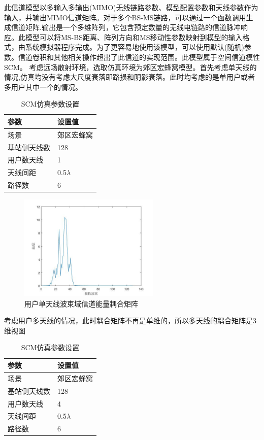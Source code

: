 \documentclass[bachelor,nocolorlinks, printoneside]{seuthesis} %
\begin{document}
\begin{Main}
此信道模型以多输入多输出(MIMO)无线链路参数、模型配置参数和天线参数作为输入，并输出MIMO信道矩阵。对于多个BS-MS链路，可以通过一个函数调用生成信道矩阵.输出是一个多维阵列，它包含预定数量的无线电链路的信道脉冲响应。此模型可以将MS-BS距离、阵列方向和MS移动性参数映射到模型的输入格式，由系统模拟器程序完成。为了更容易地使用该模型，可以使用默认(随机)参数。信道卷积和其他相关操作超出了此信道的实现范围。此模型属于空间信道模性SCM。
考虑远场散射环境，选取仿真环境为郊区宏蜂窝模型。首先考虑单天线的情况,仿真均没有考虑大尺度衰落即路损和阴影衰落。此时均考虑的是单用户或者多用户其中一个的情况。
\begin{table}[htbp]
	\centering
	\caption{\label{tab:test}SCM仿真参数设置}
	\begin{tabular}{ll}
		\toprule
		参数 &  设置值 \\
				\bottomrule
		场景 &  郊区宏蜂窝 \\
				\bottomrule
		基站侧天线数 & 128 \\
				\bottomrule
		用户数天线	& 1 \\
				\bottomrule
		天线间距 & 0.5$\lambda$ \\
				\bottomrule
		路径数 & 6 \\
		\bottomrule
	\end{tabular}
\end{table}
	
\begin{figure}[htbp!]
	\centering \includegraphics[width=0.6\textwidth]{img/2_2.jpg} \caption{用户单天线波束域信道能量耦合矩阵}
\end{figure}
考虑用户多天线的情况，此时耦合矩阵不再是单维的，所以多天线的耦合矩阵是3维视图
\begin{table}[htbp]
	\centering
	\caption{\label{tab:test}SCM仿真参数设置}
	\begin{tabular}{ll}
		\toprule
		参数 &  设置值 \\
		\bottomrule
		场景 &  郊区宏蜂窝 \\
		\bottomrule
		基站侧天线数 & 128 \\
		\bottomrule
		用户数天线	& 4 \\
		\bottomrule
		天线间距 & 0.5$\lambda$ \\
		\bottomrule
		路径数 & 6 \\
		\bottomrule
	\end{tabular}
\end{table}


\end{Main}
\end{document}
